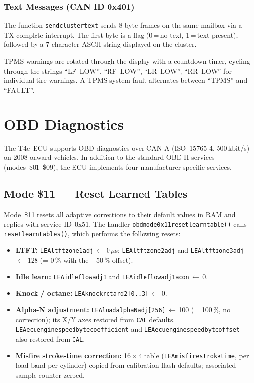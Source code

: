 \documentclass[a4paper,11pt]{article}
\renewcommand{\_}{\oldunderscore\allowbreak}
\begin{document}
\subsubsection*{Text Messages (CAN ID 0x401)}

The function \texttt{send\_cluster\_text} sends 8-byte frames on the same
mailbox via a TX-complete interrupt. The first byte is a flag (0\,=\,no text,
1\,=\,text present), followed by a 7-character ASCII string displayed on
the cluster.

TPMS warnings are rotated through the display with a countdown timer,
cycling through the strings ``LF~LOW'', ``RF~LOW'', ``LR~LOW'', ``RR~LOW''
for individual tire warnings. A TPMS system fault alternates between
``TPMS'' and ``FAULT''.

\section{OBD Diagnostics}

The T4e~ECU supports OBD diagnostics over CAN-A (ISO~15765-4, 500\,kbit/s)
on 2008-onward vehicles. In addition to the standard OBD-II services
(modes~\$01--\$09), the ECU implements four manufacturer-specific services.

\subsection{Mode \$11 --- Reset Learned Tables}

Mode~\$11 resets all adaptive corrections to their default values in RAM and
replies with service ID~0x51. The handler
\texttt{obd\_mode\_0x11\_reset\_learn\_table()} calls
\texttt{reset\_learn\_tables()}, which performs the following resets:

\begin{itemize}
\item \textbf{LTFT:} \texttt{LEA\_ltft\_zone1\_adj}\,$\leftarrow$\,0\,$\mu$s;
      \texttt{LEA\_ltft\_zone2\_adj} and \texttt{LEA\_ltft\_zone3\_adj}\,$\leftarrow$\,128
      (= 0\,\% with the $-$50\,\% offset).
\item \textbf{Idle learn:} \texttt{LEA\_idle\_flow\_adj1} and
      \texttt{LEA\_idle\_flow\_adj1\_ac\_on}\,$\leftarrow$\,0.
\item \textbf{Knock / octane:} \texttt{LEA\_knock\_retard2[0..3]}\,$\leftarrow$\,0.
\item \textbf{Alpha-N adjustment:} \texttt{LEA\_load\_alphaN\_adj[256]}\,$\leftarrow$\,100
      (= 100\,\%, no correction); its X/Y axes restored from \texttt{CAL\_} defaults.
      \texttt{LEA\_ecu\_engine\_speed\_byte\_coefficient} and
      \texttt{LEA\_ecu\_engine\_speed\_byte\_offset} also restored from \texttt{CAL\_}.
\item \textbf{Misfire stroke-time correction:} 16\,$\times$\,4 table
      (\texttt{LEA\_misfire\_stroke\_time}, per load-band per cylinder) copied from
      calibration flash defaults; associated sample counter zeroed.
\end{itemize}
\end{document}
